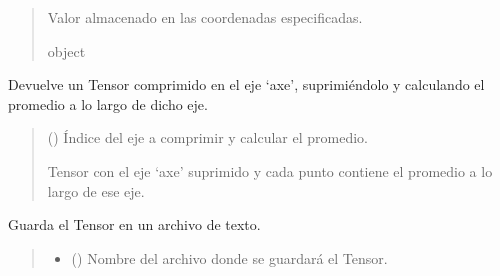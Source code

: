 \documentclass[letterpaper,10pt,english]{sphinxmanual}
\begin{document}
\begin{fulllineitems}
\begin{fulllineitems}
\begin{quote}
\begin{description}
\sphinxAtStartPar
Valor almacenado en las coordenadas especificadas.

\sphinxAtStartPar
object

\end{description}\end{quote}

\end{fulllineitems}


\begin{fulllineitems}
\label{\detokenize{myutils:myutils.tensor.Tensor.mean}}
\pysigstartsignatures
{}
\pysigstopsignatures
\sphinxAtStartPar
Devuelve un Tensor comprimido en el eje ‘axe’, suprimiéndolo y calculando el promedio a lo largo de dicho eje.
\begin{quote}\begin{description}
\sphinxAtStartPar
{} () \textendash{} Índice del eje a comprimir y calcular el promedio.

\sphinxAtStartPar
Tensor con el eje ‘axe’ suprimido y cada punto contiene el promedio a lo largo de ese eje.

\sphinxAtStartPar
{\hyperref[\detokenize{myutils:myutils.tensor.Tensor}]{}}

\end{description}\end{quote}

\end{fulllineitems}


\begin{fulllineitems}
\label{\detokenize{myutils:myutils.tensor.Tensor.save}}
\pysigstartsignatures
{}
\pysigstopsignatures
\sphinxAtStartPar
Guarda el Tensor en un archivo de texto.
\begin{quote}\begin{description}
\begin{itemize}
\item {} 
\sphinxAtStartPar
{} () \textendash{} Nombre del archivo donde se guardará el Tensor.


\end{itemize}
\end{description}
\end{quote}
\end{fulllineitems}
\end{fulllineitems}
\end{document}
